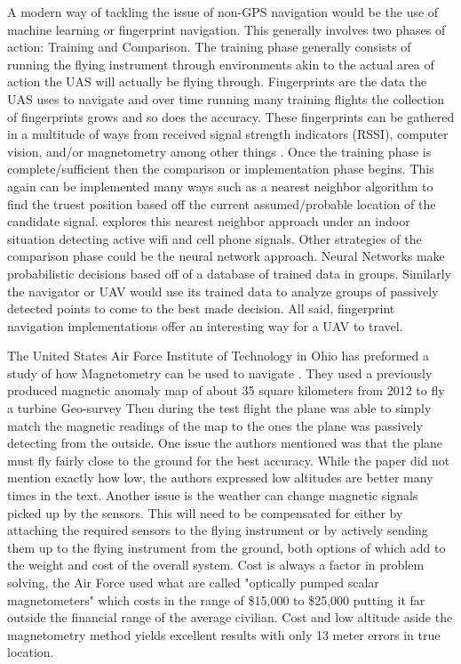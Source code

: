 \documentclass[]{article}
\begin{document}
    A modern way of tackling the issue of non-GPS navigation would be the use of machine learning or fingerprint navigation. This generally involves two phases of action: Training and Comparison. The training phase generally consists of running the flying instrument through environments akin to the actual area of action the UAS will actually be flying through. Fingerprints are the data the UAS uses to navigate and over time running many training flights the collection of fingerprints grows and so does the accuracy. These fingerprints can be gathered in a multitude of ways from received signal strength indicators (RSSI), computer vision, and/or magnetometry among other things \cite{tag7}\cite{tag13}. Once the training phase is complete/sufficient then the comparison or implementation phase begins. This again can be implemented many ways such as a nearest neighbor algorithm to find the truest position based off the current assumed/probable location of the candidate signal. \cite{tag7} explores this nearest neighbor approach under an indoor situation detecting active wifi and cell phone signals. Other strategies of the comparison phase could be the neural network approach. Neural Networks make probabilistic decisions based off of a database of trained data in groups. Similarly the navigator or UAV would use its trained data to analyze groups of passively detected points to come to the best made decision. All said, fingerprint navigation implementations offer an interesting way for a UAV to travel.\newline
    
    The United States Air Force Institute of Technology in Ohio has preformed a study of how Magnetometry can be used to navigate \cite{tag8}. They used a previously produced magnetic anomaly map of about 35 square kilometers from 2012 to fly a turbine Geo-survey Then during the test flight the plane was able to simply match the magnetic readings of the map to the ones the plane was passively detecting from the outside. One issue the authors mentioned was that the plane must fly fairly close to the ground for the best accuracy. While the paper did not mention exactly how low, the authors expressed low altitudes are better many times in the text. Another issue is the weather can change magnetic signals picked up by the sensors. This will need to be compensated for either by attaching the required sensors to the flying instrument or by actively sending them up to the flying instrument from the ground, both options of which add to the weight and cost of the overall system. Cost is always a factor in problem solving, the Air Force used what are called "optically pumped scalar magnetometers" which costs in the range of \$15,000 to \$25,000 putting it far outside the financial range of the average civilian. Cost and low altitude aside the magnetometry method yields excellent results with only 13 meter errors in true location.\newline
    
\end{document}
